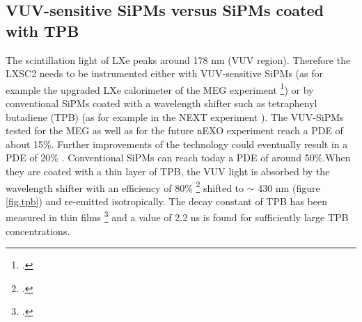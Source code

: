\subsection*{VUV-sensitive SiPMs versus SiPMs coated with TPB}
%
%
%
%
%

The scintillation light of LXe peaks around 178 nm (VUV region). Therefore the LXSC2 needs to be instrumented either with VUV-sensitive SiPMs (as for example the upgraded LXe calorimeter of the 
MEG experiment \footcite{Ogawa:2015ucj}) or by conventional SiPMs coated with a wavelength shifter such as tetraphenyl butadiene (TPB) (as for example in the NEXT experiment \cite{Alvarez:2013gxa}). 
The VUV-SiPMs tested for the MEG as well as for the future nEXO 
experiment \cite{Ogawa:2015ucj,Ostrovskiy:2015oja} reach a PDE of about 
15\%. Further improvements of the technology could eventually result in a PDE of 20\% .  Conventional SiPMs can reach today a PDE of around 50\%.When they are coated with a thin layer of TPB, the VUV light is absorbed by the wavelength shifter with an efficiency of 80\% \footcite{Gehman:2011xm}
shifted to $\sim$ 430 nm (figure \ref{fig.tpb}) and re-emitted isotropically. The decay constant of TPB has been measured  in thin films \footcite{TPBtau} and a value of 2.2 ns is found for sufficiently large TPB concentrations. 

